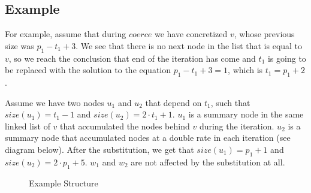 \subsection*{Example}
For example, assume that during $coerce$ we have concretized $v$, whose previous size was $p_1-t_1+3$. We see that there is no next node in the list that is equal to $v$, so we reach the conclusion that end of the iteration has come and $t_1$ is going to be replaced with the solution to the equation $p_1-t_1+3=1$, which is $t_1=p_1+2$.

Assume we have two nodes $u_1$ and $u_2$ that depend on $t_1$, such that $size(u_1)=t_1-1$ and $size(u_2)=2\cdot t_1+1$. $u_1$ is a summary node in the same linked list of $v$ that accumulated the nodes behind $v$ during the iteration. $u_2$ is a summary node that accumulated nodes at a double rate in each iteration (see diagram below). After the substitution, we get that $size(u_1)=p_1+1$ and $size(u_2)=2\cdot p_1+5$. $w_1$ and $w_2$ are not affected by the substitution at all.
\begin{figure}[h]
	\centering
	\captionsetup{labelformat=empty}
	\caption{Example Structure}
\end{figure}